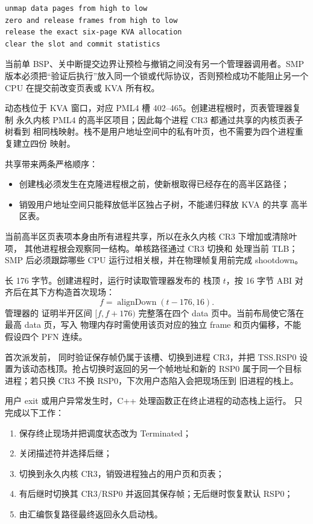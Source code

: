 \begin{verbatim}
unmap data pages from high to low
zero and release frames from high to low
release the exact six-page KVA allocation
clear the slot and commit statistics
\end{verbatim}

当前单 BSP、关中断提交边界让预检与撤销之间没有另一个管理器调用者。SMP
版本必须把“验证后执行”放入同一个锁或代际协议，否则预检成功不能阻止另一个
CPU 在提交前改变页表或 KVA 所有权。

动态栈位于 KVA 窗口，对应 PML4 槽 402--465。创建进程根时，页表管理器复制
永久内核 PML4 的高半区项目；因此每个进程 CR3 都通过共享的内核页表子树看到
相同栈映射。栈不是用户地址空间中的私有叶页，也不需要为四个进程重复建立四份
映射。

共享带来两条严格顺序：

\begin{itemize}
  \item 创建栈必须发生在克隆进程根之前，使新根取得已经存在的高半区路径；
  \item 销毁用户地址空间只能释放低半区独占子树，不能递归释放 KVA 的共享
        高半区表。
\end{itemize}

当前高半区页表项本身由所有进程共享，所以在永久内核 CR3 下增加或清除叶项，
其他进程根会观察同一结构。单核路径通过 CR3 切换和  处理当前
TLB；SMP 后必须跟踪哪些 CPU 运行过相关根，并在物理帧复用前完成 shootdown。

 长 176 字节。创建进程时，运行时读取管理器发布的
栈顶 \(t\)，按 16 字节 ABI 对齐后在其下方构造首次现场：
\[
  f=\operatorname{alignDown}(t-176,16).
\]
管理器的  证明半开区间
\([f,f+176)\) 完整落在四个 data 页中。当前布局使它落在最高 data 页，写入
物理内存时需使用该页对应的独立 frame 和页内偏移，不能假设四个 PFN 连续。

首次派发前， 同时验证保存帧仍属于该槽、切换到进程
CR3，并把 TSS.RSP0 设置为该动态栈顶。抢占切换时返回的另一个帧地址和新的
RSP0 属于同一个目标进程；若只换 CR3 不换 RSP0，下次用户态陷入会把现场压到
旧进程的栈上。

用户 exit 或用户异常发生时，C++ 处理函数正在终止进程的动态栈上运行。
 只完成以下工作：

\begin{enumerate}[label=\arabic*.]
  \item 保存终止现场并把调度状态改为 Terminated；
  \item 关闭描述符并选择后继；
  \item 切换到永久内核 CR3，销毁进程独占的用户页和页表；
  \item 有后继时切换其 CR3/RSP0 并返回其保存帧；无后继时恢复默认 RSP0；
  \item 由汇编恢复路径最终返回永久启动栈。
\end{enumerate}

